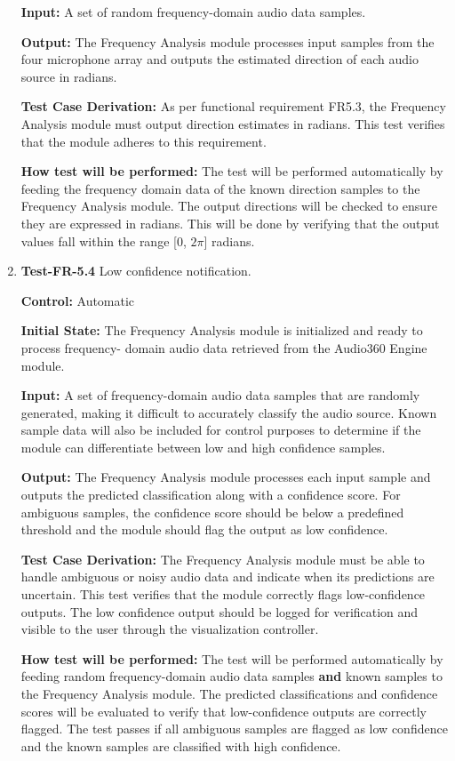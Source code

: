 \documentclass[12pt, titlepage]{article}
\begin{document}
\begin{enumerate}
\textbf{Input:}
A set of random frequency-domain audio data samples.

\textbf{Output:}
The Frequency Analysis module processes input samples from the four microphone
array and outputs the estimated direction of each audio source in radians.

\textbf{Test Case Derivation:}
As per functional requirement FR5.3, the Frequency Analysis module must
output direction estimates in radians. This test verifies that the module
adheres to this requirement.

\textbf{How test will be performed:}
The test will be performed automatically by feeding the frequency
domain data of the known direction samples to the Frequency Analysis module.
The output directions will be checked to ensure they are expressed in radians.
This will be done by verifying that the output values fall within the range
[0, \(2\pi\)] radians.

\item{\textbf{Test-FR-5.4} Low confidence notification.\\}

\textbf{Control:} Automatic

\textbf{Initial State:}
The Frequency Analysis module is initialized and ready to process frequency-
domain audio data retrieved from the Audio360 Engine module.

\textbf{Input:}
A set of frequency-domain audio data samples that are randomly generated,
making it difficult to accurately classify the audio source. Known sample
data will also be included for control purposes to determine if the module
can differentiate between low and high confidence samples.

\textbf{Output:}
The Frequency Analysis module processes each input sample and outputs
the predicted classification along with a confidence score. For ambiguous
samples, the confidence score should be below a predefined threshold and 
the module should flag the output as low confidence.

\textbf{Test Case Derivation:}
The Frequency Analysis module must be able to handle ambiguous or noisy
audio data and indicate when its predictions are uncertain. This test
verifies that the module correctly flags low-confidence outputs. The low
confidence output should be logged for verification and visible to the user
through the visualization controller.

\textbf{How test will be performed:}
The test will be performed automatically by feeding random frequency-domain 
audio data samples \textbf{and} known samples to the Frequency Analysis module.
The predicted classifications and confidence scores will be evaluated
to verify that low-confidence outputs are correctly flagged. The test passes
if all ambiguous samples are flagged as low confidence and the known samples
are classified with high confidence.

\end{enumerate}
\end{document}
